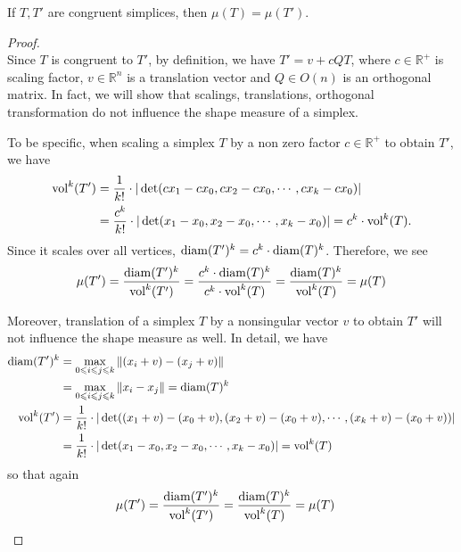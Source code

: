     \begin{lemma*}
    If $T, T'$ are congruent simplices, then $\mu(T) = \mu(T')$.
    \end{lemma*}
    \begin{proof}\mbox{}\\
    Since $T$ is congruent to $T'$, by definition, we have $T' = v + cQT$, where $c\in\mathbb{R}^{+}$ is scaling factor, $v\in\mathbb{R}^n$ is a translation vector and $Q\in O(n)$ is an orthogonal matrix. In fact, we will show that scalings, translations, orthogonal transformation do not influence the shape measure of a simplex. 
    
    To be specific, when scaling a simplex $T$ by a non zero factor $c\in\mathbb{R}^{+}$ to obtain $T'$, we have 
    \begin{align*}
     \operatorname{vol}^k(T') &= \frac{1}{k!}\cdot|\det(cx_1-cx_0, cx_2-cx_0,\cdots, cx_k-cx_0)| \\
               &= \frac{c^k}{k!}\cdot|\det(x_1-x_0, x_2-x_0,\cdots, x_k-x_0)| = c^k\cdot \operatorname{vol}^k(T).
    \end{align*}
    Since it scales over all vertices, $\operatorname{diam}(T')^k = c^k\cdot \operatorname{diam}(T)^k$. Therefore, we see
    \begin{align*}
    \mu(T') = \frac{\operatorname{diam}(T')^k}{\operatorname{vol}^k(T')} = \frac{c^k\cdot \operatorname{diam}(T)^k}{c^k\cdot \operatorname{vol}^k(T)} = \frac{\operatorname{diam}(T)^k}{\operatorname{vol}^k(T)} = \mu(T)
    \end{align*}

    Moreover, translation of a simplex $T$ by a nonsingular vector $v$ to obtain $T'$ will not influence the shape measure as well. In detail, we have
    \begin{align*}
    \operatorname{diam}(T')^k &= \max_{0\leqslant i\leqslant j\leqslant k} \|(x_i + v) - (x_j + v)\|\\ 
               &= \max_{0\leqslant i\leqslant j\leqslant k}\|x_i - x_j\| = \operatorname{diam}(T)^k \\
    \operatorname{vol}^k(T') &= \frac{1}{k!}\cdot|\det((x_1+v) - (x_0+v), (x_2+v)-(x_0+v),\cdots,(x_k+v)-(x_0+v))|\\
              &= \frac{1}{k!}\cdot|\det(x_1-x_0, x_2-x_0,\cdots, x_k-x_0)| = \operatorname{vol}^k(T)\\
    \end{align*}
    so that again  
    \begin{align*}
    \mu(T') &= \frac{\operatorname{diam}(T')^k}{\operatorname{vol}^k(T')} = \frac{\operatorname{diam}(T)^k}{\operatorname{vol}^k(T)} = \mu(T)
    \end{align*}


\end{proof}
